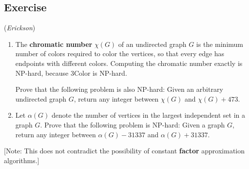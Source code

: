 \documentclass[14pt]{extreport}
\newcounter{counter}
\newcommand{\Exercise}{Exercise \stepcounter{counter}\thecounter}
\begin{document}
\subsection*{\Exercise}
(\textit{Erickson})
    \begin{enumerate}
        \item The \textbf{chromatic number} $\chi(G)$ of an undirected graph $G$ is the minimum number of colors required to color the vertices, so that every edge has endpoints with different colors. Computing the chromatic number exactly is \textsf{NP-hard}, because \textsf{3Color} is \textsf{NP-hard}. 
        
        \vspace{2mm}
        Prove that the following problem is also \textsf{NP-hard}: Given an arbitrary undirected graph $G$, return any integer between $\chi(G)$ and $\chi(G) + 473$.
        \item Let $\alpha(G)$ denote the number of vertices in the largest independent set in a graph $G$. Prove that the following problem is \textsf{NP-hard}: Given a graph $G$, return any integer between $\alpha(G) - 31337$ and $\alpha(G) + 31337$.
    \end{enumerate}
    [Note: This does not contradict the possibility of constant \textbf{factor} approximation algorithms.]
    
\end{document}
